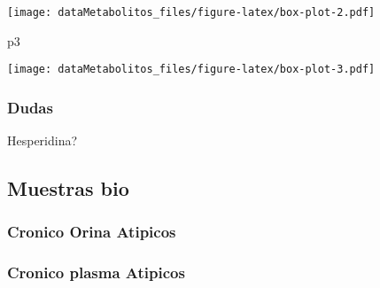 \documentclass[
]{article}
\newenvironment{Shaded}{\begin{snugshade}}{\end{snugshade}}
\newcommand{\NormalTok}[1]{#1}
\begin{document}
\texttt{[image: dataMetabolitos\_files/figure-latex/box-plot-2.pdf]}

\begin{Shaded}
\begin{Highlighting}[]
\NormalTok{p3}
\end{Highlighting}
\end{Shaded}

\texttt{[image: dataMetabolitos\_files/figure-latex/box-plot-3.pdf]}

\hypertarget{dudas}{%
\subsubsection{Dudas}\label{dudas}}

Hesperidina?

\hypertarget{muestras-bio}{%
\subsection{Muestras bio}\label{muestras-bio}}

\hypertarget{cronico-orina-atipicos}{%
\subsubsection{Cronico Orina Atipicos}\label{cronico-orina-atipicos}}

\hypertarget{cronico-plasma-atipicos}{%
\subsubsection{Cronico plasma Atipicos}\label{cronico-plasma-atipicos}}
\end{document}
